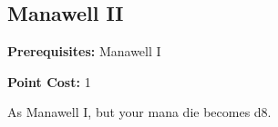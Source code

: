 \subsection*{Manawell II}\label{feat:manawell2}

\noindent
\textbf{Prerequisites:} Manawell I

\noindent
\textbf{Point Cost:} 1 

As Manawell I, but your mana die becomes d8.
